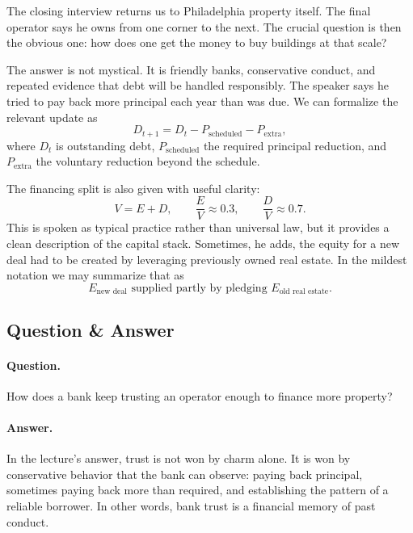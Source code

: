 The closing interview returns us to Philadelphia property itself. The final operator says he owns from one corner to the next. The crucial question is then the obvious one: how does one get the money to buy buildings at that scale?

The answer is not mystical. It is friendly banks, conservative conduct, and repeated evidence that debt will be handled responsibly. The speaker says he tried to pay back more principal each year than was due. We can formalize the relevant update as
\begin{equation}
D_{t+1} = D_t - P_{\text{scheduled}} - P_{\text{extra}},
\end{equation}
where \(D_t\) is outstanding debt, \(P_{\text{scheduled}}\) the required principal reduction, and \(P_{\text{extra}}\) the voluntary reduction beyond the schedule.

The financing split is also given with useful clarity:
\begin{equation}
V = E + D,
\qquad
\frac{E}{V} \approx 0.3,
\qquad
\frac{D}{V} \approx 0.7.
\end{equation}
This is spoken as typical practice rather than universal law, but it provides a clean description of the capital stack. Sometimes, he adds, the equity for a new deal had to be created by leveraging previously owned real estate. In the mildest notation we may summarize that as
\begin{equation}
E_{\text{new deal}} \text{ supplied partly by pledging } E_{\text{old real estate}}.
\end{equation}

\subsection{Question \& Answer}

\paragraph{Question.} How does a bank keep trusting an operator enough to finance more property?

\paragraph{Answer.} In the lecture's answer, trust is not won by charm alone. It is won by conservative behavior that the bank can observe: paying back principal, sometimes paying back more than required, and establishing the pattern of a reliable borrower. In other words, bank trust is a financial memory of past conduct.

